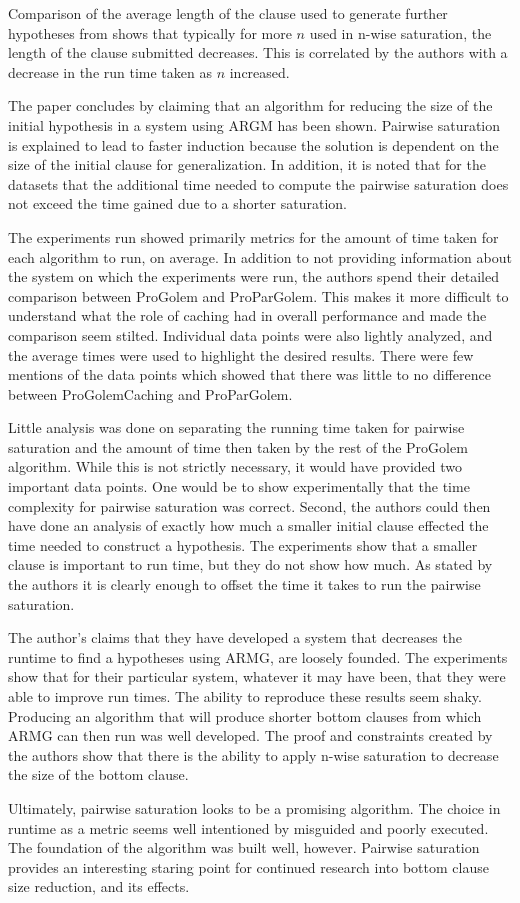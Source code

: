 \documentclass[jair,twoside,11pt,theapa]{article}
\begin{document}
Comparison of the average length of the clause used to generate further hypotheses from shows that typically for more $n$ used in n-wise saturation, the length of the clause submitted decreases. This is correlated by the authors with a decrease in the run time taken as $n$ increased. 

The paper concludes by claiming that an algorithm for reducing the size of the initial hypothesis in a system using ARGM has been shown. Pairwise saturation is explained to lead to faster induction because the solution is dependent on the size of the initial clause for generalization. In addition, it is noted that for the datasets that the additional time needed to compute the pairwise saturation does not exceed the time gained due to a shorter saturation. 

The experiments run showed primarily metrics for the amount of time taken for each algorithm to run, on average. In addition to not providing information about the system on which the experiments were run, the authors spend their detailed comparison between ProGolem and ProParGolem. This makes it more difficult to understand what the role of caching had in overall performance and made the comparison seem stilted. Individual data points were also lightly analyzed, and the average times were used to highlight the desired results. There were few mentions of the data points which showed that there was little to no difference between ProGolemCaching and ProParGolem. 

Little analysis was done on separating the running time taken for pairwise saturation and the amount of time then taken by the rest of the ProGolem algorithm. While this is not strictly necessary, it would have provided two important data points. One would be to show experimentally that the time complexity for pairwise saturation was correct. Second, the authors could then have done an analysis of exactly how much a smaller initial clause effected the time needed to construct a hypothesis. The experiments show that a smaller clause is important to run time, but they do not show how much. As stated by the authors it is clearly enough to offset the time it takes to run the pairwise saturation. 

The author's claims that they have developed a system that decreases the runtime to find a hypotheses using ARMG, are loosely founded. The experiments show that for their particular system, whatever it may have been, that they were able to improve run times. The ability to reproduce these results seem shaky. Producing an algorithm that will produce shorter bottom clauses from which ARMG can then run was well developed. The proof and constraints created by the authors show that there is the ability to apply n-wise saturation to decrease the size of the bottom clause. 

Ultimately, pairwise saturation looks to be a promising algorithm. The choice in runtime as a metric seems well intentioned by misguided and poorly executed. The foundation of the algorithm was built well, however. Pairwise saturation provides an interesting staring point for continued research into bottom clause size reduction, and its effects. 


\vskip 0.2in


\end{document}
